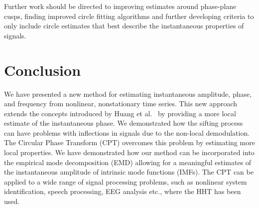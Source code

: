 \documentclass[a4paper]{IEEEtran}
\begin{document}
Further work should be directed to improving estimates around phase-plane cusps, finding improved circle fitting algorithms and further developing criteria to only include circle estimates that best describe the instantaneous properties of signals.



\section{Conclusion}\label{sect:ConclusionSection}
We have presented a new method for estimating instantaneous amplitude, phase, and frequency from nonlinear, nonstationary time series. This new approach extends the concepts introduced by Huang et al.~\cite{Huang1998} by providing a more local estimate of the instantaneous phase. We demonstrated how the sifting process can have problems with inflections in signals due to the non-local demodulation. The Circular Phase Transform (CPT) overcomes this problem by estimating more local properties. We have demonstrated how our method can be incorporated into the empirical mode decomposition (EMD) allowing for a meaningful estimates of the instantaneous amplitude of intrinsic mode functions (IMFs). The CPT can be applied to a wide range of signal processing problems, such as nonlinear system identification, speech processing, EEG analysis etc., where the HHT has been used. 


\end{document}
